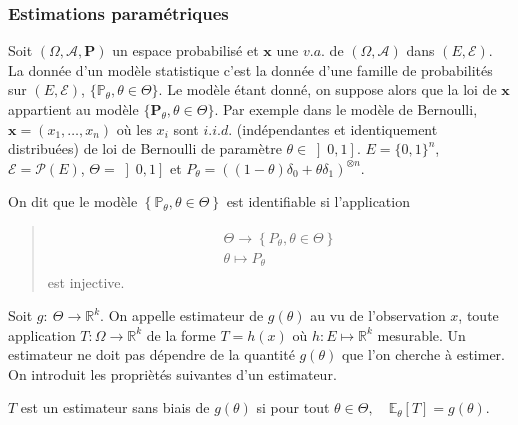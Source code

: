 \documentclass[letterpaper,11pt,english]{sphinxmanual}
\begin{document}
\subsubsection{Estimations paramétriques}
\label{\detokenize{chapter2:estimations-parametriques}}
\begin{DUlineblock}{0em}
\item[] Soit \((\Omega,\mathcal{A},\mathbf{P})\) un espace probabilisé et
\(\mathbf{x}\) une \(v.a.\) de \((\Omega,\mathcal{A})\)
dans \((E,\mathcal{E})\). La donnée d’un modèle statistique c’est
la donnée d’une famille de probabilités sur \((E,\mathcal{E})\),
\(\{\mathbb{P}_{\theta},\theta\in\Theta\}\). Le modèle étant
donné, on suppose alors que la loi de \(\mathbf{x}\) appartient au
modèle \(\{\mathbf{P}_{\theta},\theta\in\Theta\}\). Par exemple
dans le modèle de Bernoulli, \(\mathbf{x} = (x_1,\dots,x_n)\) où
les \(x_i\) sont \(i.i.d.\) (indépendantes et identiquement
distribuées) de loi de Bernoulli de paramètre
\(\theta\in\left]0,1\right]\). \(E = \{0,1\}^n\),
\(\mathcal{E} = \mathcal{P}(E)\),
\(\Theta = \left]0,1\right]\) et
\(P_{\theta}=\left((1-\theta) \delta_{0}+\theta \delta_{1}\right)^{\otimes n}.\)
\item[] 
\item[] On dit que le modèle
\(\left\{\mathbb{P}_{\theta},\theta\in\Theta\right\}\) est
identifiable si l’application
\end{DUlineblock}
\begin{quote}
\begin{equation}\label{equation:chapter2:chapter2:62}
\begin{split}\begin{array}{l}
        \Theta \rightarrow\left\{P_{\theta}, \theta \in \Theta\right\} \\
        \theta \mapsto P_{\theta}
    \end{array}\end{split}
\end{equation}
\sphinxAtStartPar
est injective.
\end{quote}

\begin{DUlineblock}{0em}
\item[] 
\item[] Soit \(g:\  \Theta\rightarrow\mathbb{R}^k\). On appelle estimateur
de \(g(\theta)\) au vu de l’observation \(x\), toute
application \(T : \Omega\rightarrow \mathbb{R}^k\) de la forme
\(T = h(x)\) où \(h : E\mapsto\mathbb{R}^k\) mesurable. Un
estimateur ne doit pas dépendre de la quantité \(g(\theta)\) que
l’on cherche à estimer. On introduit les propriètés suivantes d’un
estimateur.
\item[] 
\item[] \(T\) est un estimateur sans biais de \(g(\theta)\) si pour
tout
\(\theta \in\Theta,\quad \mathbb{E}_{\theta}[T] = g(\theta)\).
\end{DUlineblock}
\end{document}
